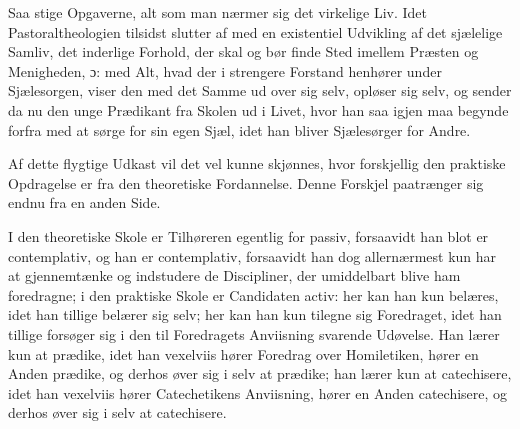 \documentclass[12pt,a4paper]{book}
\newcommand{\opage}[1]{\marginnote{\footnotesize\textit{[#1]}}}
\begin{document}
Saa stige Opgaverne, alt som man nærmer sig det virkelige Liv. Idet
Pastoraltheologien tilsidst slutter af med en existentiel Udvikling af det
sjælelige Samliv, det inderlige Forhold, der skal og bør finde Sted imellem
Præsten og Menigheden, ɔ: med Alt, hvad der i strengere Forstand henhører
under Sjælesorgen, viser den med det Samme ud over sig selv, opløser sig
selv, og sender da nu den unge Prædikant fra Skolen ud i Livet, hvor han saa
igjen maa begynde forfra med at sørge for sin egen Sjæl, idet han bliver
Sjælesørger for Andre.

Af dette flygtige Udkast vil det vel kunne skjønnes, hvor forskjellig den
praktiske Opdragelse er fra den theoretiske
\opage{164} Fordannelse. Denne Forskjel paatrænger sig endnu fra en anden Side.

I den theoretiske Skole er Tilhøreren egentlig for passiv, forsaavidt han
blot er contemplativ, og han er contemplativ, forsaavidt han dog allernærmest
kun har at gjennemtænke og indstudere de Discipliner, der umiddelbart blive
ham foredragne; i den praktiske Skole er Candidaten activ: her kan han kun
belæres, idet han tillige belærer sig selv; her kan han kun tilegne sig
Foredraget, idet han tillige forsøger sig i den til Foredragets Anviisning
svarende Udøvelse. Han lærer kun at prædike, idet han vexelviis hører
Foredrag over Homiletiken, hører en Anden prædike, og derhos øver sig i selv
at prædike; han lærer kun at catechisere, idet han vexelviis hører
Catechetikens Anviisning, hører en Anden catechisere, og derhos øver sig i
selv at catechisere.
\end{document}
